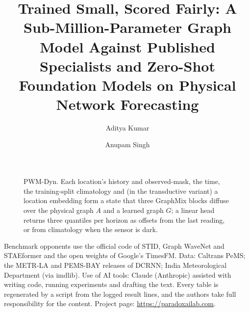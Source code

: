 \documentclass[sigconf]{acmart}
\begin{document}
\title{Trained Small, Scored Fairly: A Sub-Million-Parameter Graph Model Against Published Specialists and
Zero-Shot Foundation Models on Physical Network Forecasting}

\author{Aditya Kumar}
\author{Anupam Singh}
\renewcommand{\shortauthors}{Kumar and Singh}



\maketitle





\begin{figure}[t]
\centering
\resizebox{0.92\textwidth}{!}{}
\caption{PWM-Dyn. Each location's history and observed-mask, the time, the training-split climatology and (in the
transductive variant) a location embedding form a state that three GraphMix blocks diffuse over the physical
graph $A$ and a learned graph $G$; a linear head returns three quantiles per horizon as offsets from the last
reading, or from climatology when the sensor is dark.}
\label{fig:arch}
\end{figure}





\begin{acks}
Benchmark opponents use the official code of STID, Graph WaveNet and STAEformer and the open weights of Google's TimesFM. Data: Caltrans PeMS; the METR-LA and PEMS-BAY releases of DCRNN; India Meteorological Department (via imdlib). Use of AI tools: Claude (Anthropic) assisted with writing code, running experiments and drafting the text. Every table is regenerated by a script from the logged result lines, and the authors take full responsibility for the content. Project page: \url{https://paradoxailab.com}.
\end{acks}




\appendix

\end{document}

